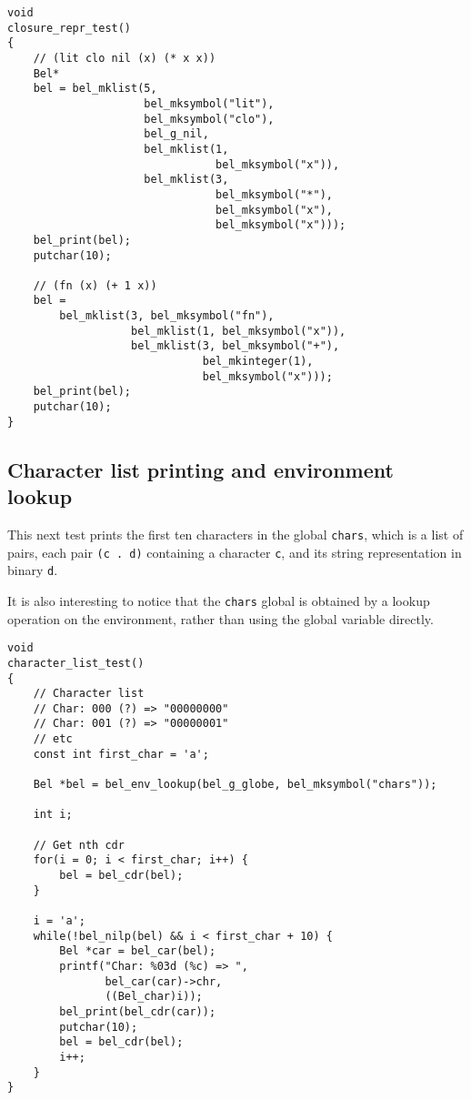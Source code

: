 \documentclass[openright,a4paper,twoside,12pt]{memoir}
\begin{document}
\begin{verbatim}
void
closure_repr_test()
{
    // (lit clo nil (x) (* x x))
    Bel*
    bel = bel_mklist(5,
                     bel_mksymbol("lit"),
                     bel_mksymbol("clo"),
                     bel_g_nil,
                     bel_mklist(1,
                                bel_mksymbol("x")),
                     bel_mklist(3,
                                bel_mksymbol("*"),
                                bel_mksymbol("x"),
                                bel_mksymbol("x")));
    bel_print(bel);
    putchar(10);

    // (fn (x) (+ 1 x))
    bel =
        bel_mklist(3, bel_mksymbol("fn"),
                   bel_mklist(1, bel_mksymbol("x")),
                   bel_mklist(3, bel_mksymbol("+"),
                              bel_mkinteger(1),
                              bel_mksymbol("x")));
    bel_print(bel);
    putchar(10);     
}
\end{verbatim}

\subsection{Character list printing and environment lookup}
\label{sec:orgac3c8d8}

This next test prints the first ten characters in the global \texttt{chars},
which is a list of pairs, each pair \texttt{(c . d)} containing a character \texttt{c},
and its string representation in binary \texttt{d}.

It is also interesting to notice that the \texttt{chars} global is obtained by
a lookup operation on the environment, rather than using the global
variable directly.

\begin{verbatim}
void
character_list_test()
{
    // Character list
    // Char: 000 (?) => "00000000"
    // Char: 001 (?) => "00000001"
    // etc
    const int first_char = 'a';
    
    Bel *bel = bel_env_lookup(bel_g_globe, bel_mksymbol("chars"));
    
    int i;

    // Get nth cdr
    for(i = 0; i < first_char; i++) {
        bel = bel_cdr(bel);
    }

    i = 'a';
    while(!bel_nilp(bel) && i < first_char + 10) {
        Bel *car = bel_car(bel);
        printf("Char: %03d (%c) => ",
               bel_car(car)->chr,
               ((Bel_char)i));
        bel_print(bel_cdr(car));
        putchar(10);
        bel = bel_cdr(bel);
        i++;
    }
}
\end{verbatim}
\end{document}
